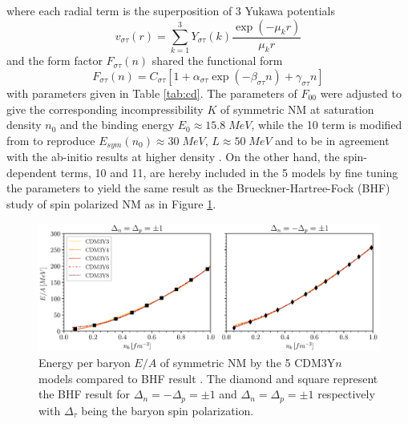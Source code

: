 where each radial term is the superposition of 3 Yukawa potentials
\begin{equation}
        v_{\sigma\tau}(r) = \sum^{3}_{k=1} Y_{\sigma\tau}(k) \frac{\exp(-\mu_k r)}{\mu_k r} 
\end{equation}
and the form factor $F_{\sigma\tau}(n)$ shared the functional form \citep{khoa1997nuclear,tan2020spin,tan2021equation,than2010ufr}
\begin{equation}
        F_{\sigma\tau}(n) = C_{\sigma\tau} [1 + \alpha_{\sigma\tau} \exp(-\beta_{\sigma\tau}n) + \gamma_{\sigma\tau}n]
\end{equation}
with parameters given in Table \ref{tab:cd}. The parameters of $F_{00}$ were adjusted to give the corresponding incompressibility $K$ of symmetric \gls{NM} at saturation density $n_0$ and the binding energy $E_0 \approx 15.8\; MeV$, while the 10 term is modified from \citep{than2010ufr} to reproduce $E_{sym}(n_0) \approx 30\;MeV$, $L\approx 50\;MeV$ and to be in agreement with the ab-initio results \citep{akmal1998equation,gandolfi2010microscopic} at higher density \citep{tan2021equation}. On the other hand, the spin-dependent terms, 10 and 11, are hereby included in the 5 models by fine tuning the parameters to yield the same result as the Brueckner-Hartree-Fock (\gls{BHF}) study of spin polarized \gls{NM} \citep{vidana2002equation} as in Figure \ref{fig:bhf}.

\begin{figure}[ht]
        \centering
        \includegraphics[width=\textwidth]{fig/BHF_fit.eps}
        \caption{Energy per baryon $E/A$ of symmetric \gls{NM} by the 5 CDM3Y$n$ models compared to \gls{BHF} result \citep{vidana2002equation}. The diamond and square represent the \gls{BHF} result for $\Delta_n=-\Delta_p=\pm 1$ and $\Delta_n=\Delta_p=\pm 1$ respectively with $\Delta_\tau$ being the baryon spin polarization.}
        \label{fig:bhf}
\end{figure} 


